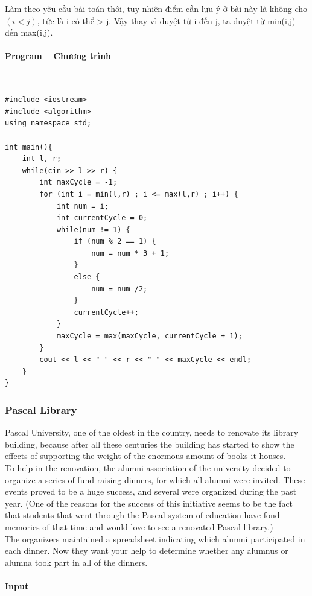 \documentclass{article}
\begin{document}
Làm theo yêu cầu bài toán thôi, tuy nhiên điểm cần lưu ý ở bài này là không cho $(i < j)$, tức là i có thể > j. Vậy thay vì duyệt từ i đến j, ta duyệt từ min(i,j) đến max(i,j).

\paragraph{Program -- Chương trình} \mbox{} \\


\begin{lstlisting}
#include <iostream>
#include <algorithm>
using namespace std;

int main(){
	int l, r;
	while(cin >> l >> r) {
		int maxCycle = -1;
		for (int i = min(l,r) ; i <= max(l,r) ; i++) {
			int num = i;
			int currentCycle = 0;
			while(num != 1) {
				if (num % 2 == 1) {
					num = num * 3 + 1;
				}
				else {
					num = num /2;
				}
				currentCycle++;
			}
			maxCycle = max(maxCycle, currentCycle + 1);
		}
		cout << l << " " << r << " " << maxCycle << endl;
	}
}
\end{lstlisting}


\subsubsection{Pascal Library}
Pascal University, one of the oldest in the country, needs to renovate its library building, because
after all these centuries the building has started to show the effects of supporting the weight of the
enormous amount of books it houses.\\
To help in the renovation, the alumni association of the university decided to organize a series
of fund-raising dinners, for which all alumni were invited. These events proved to be a huge success, and several were organized during the past year. (One of the reasons for the success of this
initiative seems to be the fact that students that went through the Pascal system of education have
fond memories of that time and would love to see a renovated Pascal library.)\\
The organizers maintained a spreadsheet indicating which alumni participated in each dinner.
Now they want your help to determine whether any alumnus or alumna took part in all of the
dinners.
\paragraph{Input} \mbox{} \\
\end{document}
